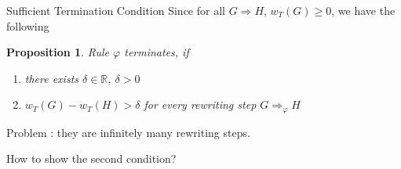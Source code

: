 \documentclass{beamer}
\newtheorem{proposition}{Proposition}
\begin{document}

\begin{frame}{Sufficient Termination Condition}
  Since for all $G \Rightarrow H$, $w_T(G) \geq 0$, we have the following

  \begin{proposition}
  Rule $\varphi$ terminates, if 

   \begin{enumerate}
      \item there exists $\delta \in \mathbb{R}$, $\delta > 0$
      \item $w_T(G) - w_T(H) > \delta$ for every rewriting step $G \Rightarrow_\varphi H$
   \end{enumerate} 
  \end{proposition}


   Problem : they are infinitely many rewriting steps.

   How to show the second condition?

\end{frame}
\end{document}
